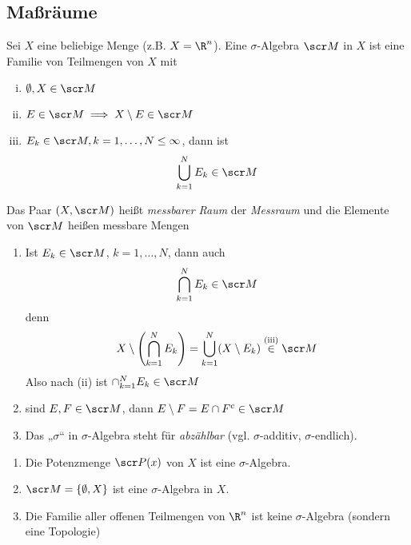 \documentclass[a4paper,10pt]{scrartcl}
\begin{document}
\subsection{Maßräume}


Sei $X$ eine beliebige Menge (z.B. $X=\R^n$).
Eine $\sigma$-Algebra $\scr M$ in $X$ ist eine Familie von Teilmengen von $X$ mit
\begin{enumerate}[(i)]
	\item
		$\emptyset, X \in \scr M$
	\item
		$E \in \scr M \implies X \setminus E \in \scr M$
	\item
		$E_k \in \scr M, k=1,\dotsc, N \le \infty$, dann ist
		\[
			\bigcup_{k=1}^N E_k \in \scr M
		\]
\end{enumerate}
Das Paar $(X,\scr M)$ heißt \emph{messbarer Raum} der \emph{Messraum} und die Elemente von $\scr M$ heißen messbare Mengen

\begin{note}
	\begin{enumerate}[1)]
		\item
			Ist $E_k \in \scr M$, $k=1,\dotsc, N$, dann auch
			\[
				\bigcap_{k=1}^N E_k \in \scr M
			\]
			denn
			\[
				X \setminus \left(\bigcap_{k=1}^N E_k\right) = \bigcup_{k=1}^N (X\setminus E_k) \stackrel{\text{(iii)}} \in \scr M
			\]
			Also nach (ii) ist $\cap_{k=1}^N E_k \in \scr M$
		\item
			sind $E, F \in \scr M$, dann $E \setminus F = E \cap F^c \in \scr M$
		\item
			Das „$\sigma$“ in $\sigma$-Algebra steht für \emph{abzählbar} (vgl. $\sigma$-additiv, $\sigma$-endlich).
	\end{enumerate}
\end{note}


\begin{ex*}
	\begin{enumerate}[1)]
		\item
			Die Potenzmenge $\scr P(x)$ von $X$ ist eine $\sigma$-Algebra.
		\item
			$\scr M = \{\emptyset, X\}$ ist eine $\sigma$-Algebra in $X$.
		\item
			Die Familie aller offenen Teilmengen von $\R^n$ ist keine $\sigma$-Algebra (sondern eine Topologie)
	\end{enumerate}
\end{ex*}
\end{document}
